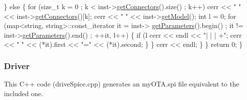 \begin{DoxyCodeInclude}
            \} \textcolor{keywordflow}{else} \{
                \textcolor{keywordflow}{for} (\textcolor{keywordtype}{size\_t} k = 0 ; k < inst->\mbox{\hyperlink{class_s_p_i_c_e_1_1_instance_acce8940edeaa3d79c522006f987e0711}{getConnectors}}().size() ; k++)
                    cerr << \textcolor{stringliteral}{" "} << inst->\mbox{\hyperlink{class_s_p_i_c_e_1_1_instance_acce8940edeaa3d79c522006f987e0711}{getConnectors}}()[k];
                cerr << \textcolor{stringliteral}{" "} << inst->\mbox{\hyperlink{class_s_p_i_c_e_1_1_instance_afc74cbe93df9c473a53db83a325f8f9d}{getModel}}();
                \textcolor{keywordtype}{int} l = 0;
                \textcolor{keywordflow}{for} (map<string, string>::const\_iterator it = inst->
      \mbox{\hyperlink{class_s_p_i_c_e_1_1_instance_aee7d59083b78d31ac5c19ab508da91e0}{getParameters}}().begin() ; it != inst->\mbox{\hyperlink{class_s_p_i_c_e_1_1_instance_aee7d59083b78d31ac5c19ab508da91e0}{getParameters}}().end() ; ++it, l++) \{
                    \textcolor{keywordflow}{if} (l%
                        cerr << endl << \textcolor{stringliteral}{"| | | +"};
                    cerr << \textcolor{stringliteral}{" "} << (*it).first << \textcolor{stringliteral}{"="} << (*it).second;
                \}
            \}
            cerr << endl;
        \}
    \}
    \textcolor{keywordflow}{return} 0;
\}

\end{DoxyCodeInclude}
\hypertarget{spice_spiceDriveC}{}\subsubsection{Driver}\label{spice_spiceDriveC}
This C++ code ({\ttfamily drive\+Spice.\+cpp}) generates an my\+O\+T\+A.\+spi file equivalent to the included one. 
